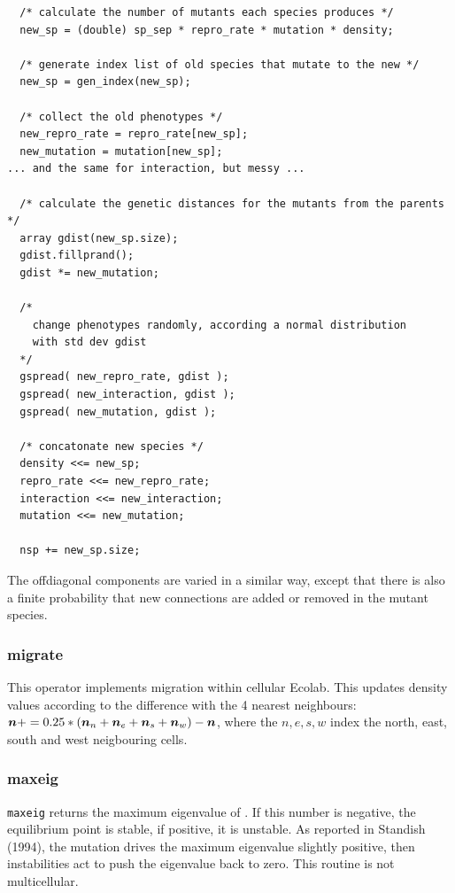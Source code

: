 \begin{verbatim}
  /* calculate the number of mutants each species produces */
  new_sp = (double) sp_sep * repro_rate * mutation * density;

  /* generate index list of old species that mutate to the new */
  new_sp = gen_index(new_sp); 

  /* collect the old phenotypes */
  new_repro_rate = repro_rate[new_sp];
  new_mutation = mutation[new_sp];
... and the same for interaction, but messy ...

  /* calculate the genetic distances for the mutants from the parents */
  array gdist(new_sp.size);
  gdist.fillprand();
  gdist *= new_mutation;

  /* 
    change phenotypes randomly, according a normal distribution 
    with std dev gdist 
  */
  gspread( new_repro_rate, gdist );
  gspread( new_interaction, gdist );
  gspread( new_mutation, gdist );

  /* concatonate new species */
  density <<= new_sp;
  repro_rate <<= new_repro_rate;
  interaction <<= new_interaction;
  mutation <<= new_mutation;

  nsp += new_sp.size;
\end{verbatim}

The offdiagonal components are varied in a similar way, except that there
is also a finite probability that new connections are added or removed in
the mutant species.

\subsubsection{migrate}\label{migrate}

This operator implements migration within cellular Ecolab. This
updates density values according to the difference with the 4 nearest
neighbours: $\mbox{\boldmath{$n$}}+=0.25*(\mbox{\boldmath{$n$}}_n+\mbox{\boldmath{$n$}}_e+\mbox{\boldmath{$n$}}_s+\mbox{\boldmath{$n$}}_w)-\mbox{\boldmath{$n$}}$, where the
$n,e,s,w$ index the north, east, south and west neigbouring cells.

\subsubsection{maxeig}\label{maxeig}

\verb|maxeig| returns the maximum eigenvalue of \bbeta. If this number
is negative, the equilibrium point is stable, if positive, it is
unstable. As reported in Standish (1994)\cite{Standish94}, the mutation
drives the maximum eigenvalue slightly positive, then instabilities
act to push the eigenvalue back to zero. This routine is not multicellular.

